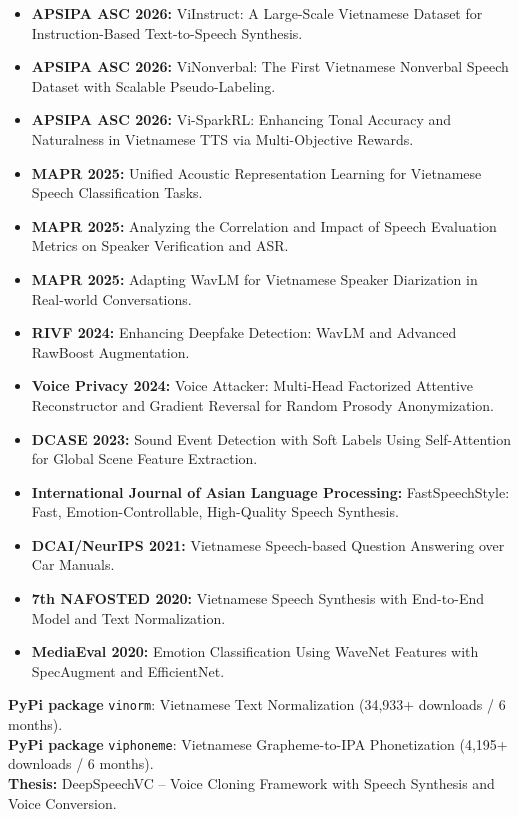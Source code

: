 \documentclass[10pt,a4paper]{article}
\begin{document}
\begin{itemize}
  \item \textbf{APSIPA ASC 2026:} ViInstruct: A Large-Scale Vietnamese Dataset for Instruction-Based Text-to-Speech Synthesis.
  \item \textbf{APSIPA ASC 2026:} ViNonverbal: The First Vietnamese Nonverbal Speech Dataset with Scalable Pseudo-Labeling.
  \item \textbf{APSIPA ASC 2026:} Vi-SparkRL: Enhancing Tonal Accuracy and Naturalness in Vietnamese TTS via Multi-Objective Rewards.
  \item \textbf{MAPR 2025:} Unified Acoustic Representation Learning for Vietnamese Speech Classification Tasks.
  \item \textbf{MAPR 2025:} Analyzing the Correlation and Impact of Speech Evaluation Metrics on Speaker Verification and ASR.
  \item \textbf{MAPR 2025:} Adapting WavLM for Vietnamese Speaker Diarization in Real-world Conversations.
  \item \textbf{RIVF 2024:} Enhancing Deepfake Detection: WavLM and Advanced RawBoost Augmentation.
  \item \textbf{Voice Privacy 2024:} Voice Attacker: Multi-Head Factorized Attentive Reconstructor and Gradient Reversal for Random Prosody Anonymization.
  \item \textbf{DCASE 2023:} Sound Event Detection with Soft Labels Using Self-Attention for Global Scene Feature Extraction.
  \item \textbf{International Journal of Asian Language Processing:} FastSpeechStyle: Fast, Emotion-Controllable, High-Quality Speech Synthesis.
  \item \textbf{DCAI/NeurIPS 2021:} Vietnamese Speech-based Question Answering over Car Manuals.
  \item \textbf{7th NAFOSTED 2020:} Vietnamese Speech Synthesis with End-to-End Model and Text Normalization.
  \item \textbf{MediaEval 2020:} Emotion Classification Using WaveNet Features with SpecAugment and EfficientNet.
\end{itemize}

\vspace{2pt}
\noindent\textbf{PyPi package} \texttt{vinorm}: Vietnamese Text Normalization (34,933+ downloads / 6 months).\\
\noindent\textbf{PyPi package} \texttt{viphoneme}: Vietnamese Grapheme-to-IPA Phonetization (4,195+ downloads / 6 months).\\[2pt]
\noindent\textbf{Thesis:} DeepSpeechVC -- Voice Cloning Framework with Speech Synthesis and Voice Conversion.
\end{document}
